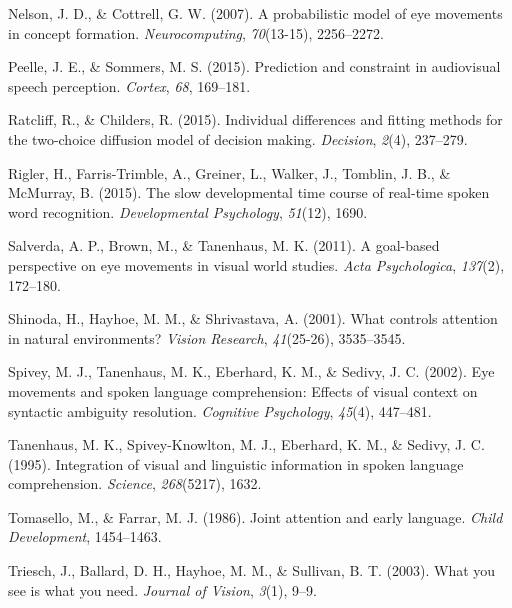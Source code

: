 \documentclass[english,floatsintext,man]{apa6}
\begin{document}
\leavevmode\hypertarget{ref-nelson2007probabilistic}{}%
Nelson, J. D., \& Cottrell, G. W. (2007). A probabilistic model of eye
movements in concept formation. \emph{Neurocomputing}, \emph{70}(13-15),
2256--2272.

\leavevmode\hypertarget{ref-peelle2015prediction}{}%
Peelle, J. E., \& Sommers, M. S. (2015). Prediction and constraint in
audiovisual speech perception. \emph{Cortex}, \emph{68}, 169--181.

\leavevmode\hypertarget{ref-ratcliff2015individual}{}%
Ratcliff, R., \& Childers, R. (2015). Individual differences and fitting
methods for the two-choice diffusion model of decision making.
\emph{Decision}, \emph{2}(4), 237--279.

\leavevmode\hypertarget{ref-rigler2015slow}{}%
Rigler, H., Farris-Trimble, A., Greiner, L., Walker, J., Tomblin, J. B.,
\& McMurray, B. (2015). The slow developmental time course of real-time
spoken word recognition. \emph{Developmental Psychology}, \emph{51}(12),
1690.

\leavevmode\hypertarget{ref-salverda2011goal}{}%
Salverda, A. P., Brown, M., \& Tanenhaus, M. K. (2011). A goal-based
perspective on eye movements in visual world studies. \emph{Acta
Psychologica}, \emph{137}(2), 172--180.

\leavevmode\hypertarget{ref-shinoda2001controls}{}%
Shinoda, H., Hayhoe, M. M., \& Shrivastava, A. (2001). What controls
attention in natural environments? \emph{Vision Research},
\emph{41}(25-26), 3535--3545.

\leavevmode\hypertarget{ref-spivey2002eye}{}%
Spivey, M. J., Tanenhaus, M. K., Eberhard, K. M., \& Sedivy, J. C.
(2002). Eye movements and spoken language comprehension: Effects of
visual context on syntactic ambiguity resolution. \emph{Cognitive
Psychology}, \emph{45}(4), 447--481.

\leavevmode\hypertarget{ref-tanenhaus1995integration}{}%
Tanenhaus, M. K., Spivey-Knowlton, M. J., Eberhard, K. M., \& Sedivy, J.
C. (1995). Integration of visual and linguistic information in spoken
language comprehension. \emph{Science}, \emph{268}(5217), 1632.

\leavevmode\hypertarget{ref-tomasello1986joint}{}%
Tomasello, M., \& Farrar, M. J. (1986). Joint attention and early
language. \emph{Child Development}, 1454--1463.

\leavevmode\hypertarget{ref-triesch2003you}{}%
Triesch, J., Ballard, D. H., Hayhoe, M. M., \& Sullivan, B. T. (2003).
What you see is what you need. \emph{Journal of Vision}, \emph{3}(1),
9--9.
\end{document}
